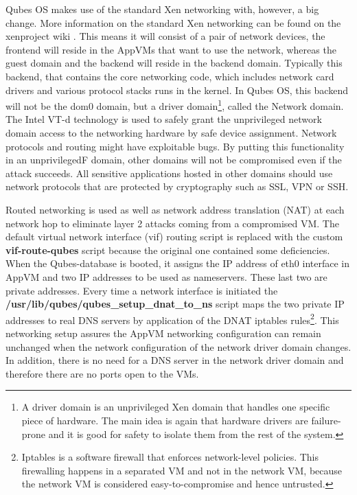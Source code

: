 \documentclass[runningheads,a4paper]{article}
\begin{document}
Qubes OS makes use of the standard Xen networking with, however, a big
change. More information on the standard Xen networking can be found
on the xenproject wiki \cite{XenNetworking}. This means it will
consist of a pair of network devices, the frontend will reside in the
AppVMs that want to use the network, whereas the guest domain and the
backend will reside in the backend domain. Typically this backend,
that contains the core networking code, which includes network card
drivers and various protocol stacks runs in the kernel. In Qubes OS,
this backend will not be the dom0 domain, but a driver
domain\footnote{A driver domain is an unprivileged Xen domain that
handles one specific piece of hardware. The main idea is again that
hardware drivers are failure-prone and it is good for safety to
isolate them from the rest of the system.}, called the Network
domain. The Intel VT-d technology is used to safely grant the
unprivileged network domain access to the networking hardware by safe
device assignment. Network protocols and routing might have
exploitable bugs. By putting this functionality in an unprivilegedF
domain, other domains will not be compromised even if the attack
succeeds. All sensitive applications hosted in other domains should
use network protocols that are protected by cryptography such as SSL,
VPN or SSH.

Routed networking is used as well as network address translation (NAT)
at each network hop to eliminate layer 2 attacks coming from a
compromised VM. The default virtual network interface (vif) routing
script is replaced with the custom \textbf{vif-route-qubes} script
because the original one contained some deficiencies. When the
Qubes-database is booted, it assigns the IP address of eth0 interface
in AppVM and two IP addresses to be used as nameservers. These last
two are private addresses. Every time a network interface is
initiated the \textbf{/usr/lib/qubes/qubes\_setup\_dnat\_to\_ns} script
maps the two private IP addresses to real DNS servers by application
of the DNAT iptables rules\footnote{Iptables is a software firewall that
enforces network-level policies. This firewalling happens in a
separated VM and not in the network VM, because the network VM is
considered easy-to-compromise and hence untrusted.}. This networking
setup assures the AppVM networking configuration can remain unchanged
when the network configuration of the network driver domain
changes. In addition, there is no need for a DNS server in the network
driver domain and therefore there are no ports open to the VMs.
\end{document}
